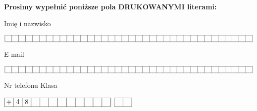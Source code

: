 \documentclass[12pt, a4paper]{article}
\begin{document}
\begin{center}
\noindent \textbf{Prosimy wypełnić poniższe pola DRUKOWANYMI literami:}
\vspace{0.5cm}
\par Imię i nazwisko
\par $\begin{array}{|c|c|c|c|c|c|c|c|c|c|c|c|c|c|c|c|c|c|c|c|c|c|c|c|c|c|c|c|c|c|c|c|c|c|c|c|}
\hline
\makebox[0.1cm]{}&\makebox[0.1cm]{}&\makebox[0.1cm]{}&\makebox[0.1cm]{}&\makebox[0.1cm]{}&\makebox[0.1cm]{}&\makebox[0.1cm]{}&\makebox[0.1cm]{}&\makebox[0.1cm]{}&\makebox[0.1cm]{}&\makebox[0.1cm]{}&\makebox[0.1cm]{}&\makebox[0.1cm]{}&\makebox[0.1cm]{}&\makebox[0.1cm]{}&\makebox[0.1cm]{}&\makebox[0.1cm]{}&\makebox[0.1cm]{}&\makebox[0.1cm]{}&\makebox[0.1cm]{}&\makebox[0.1cm]{}&\makebox[0.1cm]{}&\makebox[0.1cm]{}&\makebox[0.1cm]{}&\makebox[0.1cm]{}&\makebox[0.1cm]{}&\makebox[0.1cm]{}&\makebox[0.1cm]{}&\makebox[0.1cm]{}&\makebox[0.1cm]{}&\makebox[0.1cm]{}&\makebox[0.1cm]{}&\makebox[0.1cm]{}&\makebox[0.1cm]{}&\makebox[0.1cm]{}&\makebox[0.1cm]{}\\
\hline
\end{array}$
\vspace{0.2cm}
\par E-mail
\par $\begin{array}{|c|c|c|c|c|c|c|c|c|c|c|c|c|c|c|c|c|c|c|c|c|c|c|c|c|c|c|c|c|c|c|c|c|c|c|c|}
\hline
\makebox[0.1cm]{}&\makebox[0.1cm]{}&\makebox[0.1cm]{}&\makebox[0.1cm]{}&\makebox[0.1cm]{}&\makebox[0.1cm]{}&\makebox[0.1cm]{}&\makebox[0.1cm]{}&\makebox[0.1cm]{}&\makebox[0.1cm]{}&\makebox[0.1cm]{}&\makebox[0.1cm]{}&\makebox[0.1cm]{}&\makebox[0.1cm]{}&\makebox[0.1cm]{}&\makebox[0.1cm]{}&\makebox[0.1cm]{}&\makebox[0.1cm]{}&\makebox[0.1cm]{}&\makebox[0.1cm]{}&\makebox[0.1cm]{}&\makebox[0.1cm]{}&\makebox[0.1cm]{}&\makebox[0.1cm]{}&\makebox[0.1cm]{}&\makebox[0.1cm]{}&\makebox[0.1cm]{}&\makebox[0.1cm]{}&\makebox[0.1cm]{}&\makebox[0.1cm]{}&\makebox[0.1cm]{}&\makebox[0.1cm]{}&\makebox[0.1cm]{}&\makebox[0.1cm]{}&\makebox[0.1cm]{}&\makebox[0.1cm]{}\\
\hline
\end{array}$
\vspace{0.2cm}
\par \hspace{1.7cm} Nr telefonu \hspace{2.5cm} Klasa
\par $\begin{array}{|c|c|c|c|c|c|c|c|c|c|c|c|}
\hline
\makebox[0.1cm]{+}&\makebox[0.1cm]{4}&\makebox[0.1cm]{8}&\makebox[0.1cm]{}&\makebox[0.1cm]{}&\makebox[0.1cm]{}&\makebox[0.1cm]{}&\makebox[0.1cm]{}&\makebox[0.1cm]{}&\makebox[0.1cm]{}&\makebox[0.1cm]{}&\makebox[0.1cm]{}\\
\hline
\end{array}$
\hspace{1cm}
$\begin{array}{|c|c|}
\hline
\makebox[0.1cm]{}&\makebox[0.1cm]{}\\
\hline
\end{array}$
\end{center}\vspace{0.5cm}
\end{document}
